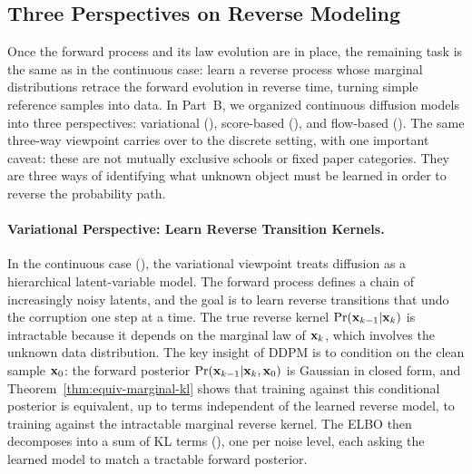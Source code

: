 \subsection{Three Perspectives on Reverse Modeling}
\label{subsec:epilogue-three-views}

Once the forward process and its law evolution are in place, the remaining task is the same as in the continuous case: learn a reverse process whose marginal distributions retrace the forward evolution in reverse time, turning simple reference samples into data. In Part~B,
we organized continuous diffusion models into three perspectives:
variational (), score-based
(), and flow-based
(). The same three-way viewpoint carries over to the discrete setting, with one important caveat: these are not mutually exclusive schools or fixed paper categories. They are three ways of identifying what unknown object must be learned in order to reverse the probability path.

\paragraph{Variational Perspective: Learn Reverse Transition Kernels.}
In the continuous case (), the variational viewpoint
treats diffusion as a hierarchical latent-variable model. The forward
process defines a chain of increasingly noisy latents, and the goal is
to learn reverse transitions that undo the corruption one step at a
time. The true reverse kernel $\Pr({\mathbf{x}}_{k-1}|{\mathbf{x}}_k)$ is intractable
because it depends on the marginal law of ${\mathbf{x}}_k$, which involves the
unknown data distribution. The key insight of DDPM is to condition on
the clean sample ${\mathbf{x}}_0$: the forward posterior
$\Pr({\mathbf{x}}_{k-1}|{\mathbf{x}}_k, {\mathbf{x}}_0)$ is Gaussian in closed form, and
Theorem~\ref{thm:equiv-marginal-kl} shows that training against this
conditional posterior is equivalent, up to terms independent of the learned reverse model, to training
against the intractable marginal reverse kernel. The ELBO then
decomposes into a sum of KL terms (), one per
noise level, each asking the learned model to match a tractable
forward posterior.

